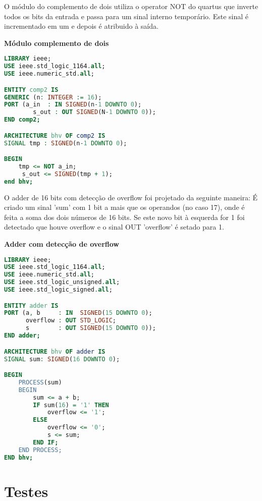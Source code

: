 \documentclass[a4paper]{article}
\begin{document}
O módulo do complemento de dois utiliza o operator NOT do quartus que inverte todos os bits da entrada e passa para um sinal interno temporário. Este sinal é incrementado em um e depois é atribuido à saída.
\bigskip

\textbf{Módulo complemento de dois}
\begin{lstlisting}[language=VHDL]
LIBRARY ieee;
USE ieee.std_logic_1164.all;
USE ieee.numeric_std.all;

ENTITY comp2 IS
GENERIC (n: INTEGER := 16);
PORT (a_in  : IN SIGNED(n-1 DOWNTO 0);
		s_out : OUT SIGNED(N-1 DOWNTO 0));
END comp2;

ARCHITECTURE bhv OF comp2 IS
SIGNAL tmp : SIGNED(n-1 DOWNTO 0);

BEGIN
    tmp <= NOT a_in;
	 s_out <= SIGNED(tmp + 1);
end bhv;
\end{lstlisting}
\smallskip

O adder de 16 bits com detecção de overflow foi projetado da seguinte maneira:
É criado um sinal 'sum' com 1 bit a mais que os operandos (no caso 17), onde é feita a soma dos dois números de 16 bits. Se este novo bit à esquerda for 1 foi detectado que houve overflow e o sinal OUT 'overflow' é setado para 1.
\bigskip

\textbf{Adder com detecção de overflow}
\begin{lstlisting}[language=VHDL]
LIBRARY ieee;
USE ieee.std_logic_1164.all;
USE ieee.numeric_std.all;
USE ieee.std_logic_unsigned.all;
USE ieee.std_logic_signed.all;

ENTITY adder IS
PORT (a, b     : IN  SIGNED(15 DOWNTO 0);
      overflow : OUT STD_LOGIC;
	  s        : OUT SIGNED(15 DOWNTO 0));
END adder;

ARCHITECTURE bhv OF adder IS
SIGNAL sum: SIGNED(16 DOWNTO 0);

BEGIN
	PROCESS(sum)
	BEGIN
		sum <= a + b;
		IF sum(16) = '1' THEN
			overflow <= '1';
		ELSE
			overflow <= '0';
			s <= sum;
		END IF;
	END PROCESS;
END bhv;
\end{lstlisting}
\smallskip

\bigskip

\section{\textbf{Testes}}

\smallskip

\end{document}
